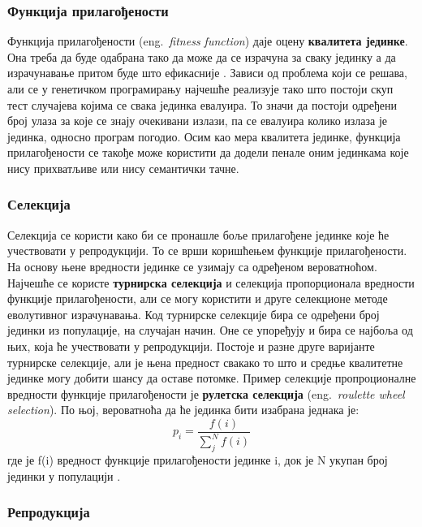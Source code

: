 \documentclass[a4paper]{article}
\begin{document}
\subsubsection{Функција прилагођености}

Функција прилагођености (eng.~{\em fitness function}) даје оцену \textbf{квалитета јединке}. Она треба да буде одабрана тако да може да се израчуна за сваку јединку а да израчунавање притом буде што ефикасније \cite{vi}. Зависи од проблема који се решава, али се у генетичком програмирању најчешће реализује тако што постоји скуп тест случајева којима се свака јединка евалуира. То значи да постоји одређени број улаза за које се знају очекивани излази, па се евалуира колико излаза је јединка, односно програм погодио.
Осим као мера квалитета јединке, функција прилагођености се такође може користити да додели пенале оним јединкама које нису прихватљиве или нису семантички тачне.

\subsubsection{Селекција}

Селекција се користи како би се пронашле боље прилагођене јединке које ће учествовати у репродукцији. То се врши коришћењем функције прилагођености. На основу њене вредности јединке се узимају са одређеном вероватноћом. Најчешће се користе \textbf{турнирска селекција} и селекција пропорционала вредности функције прилагођености, али се могу користити и друге селекционе методе еволутивног израчунавања. Код турнирске селекције бира се одређени број јединки из популације, на случајан начин. Оне се упоређују и бира се најбоља од њих, која ће учествовати у репродукцији. Постоје и разне друге варијанте турнирске селекције, али је њена предност свакако то што и средње квалитетне јединке могу добити шансу да оставе потомке. Пример селекције пропроционалне вредности функције прилагођености је \textbf{рулетска селекција} (eng.~{\em roulette wheel selection}). По њој, вероватноћа да ће јединка бити изабрана једнака је: 
\begin{equation} 
    p_i = \frac{f(i)}{\sum_{j}^{N} f(i)}
\end{equation}
где је f(i) вредност функције прилагођености јединке i, док је N укупан број јединки у популацији \cite{vi}.

\subsubsection{Репродукција}
\label{sec:reprodukcija}
\end{document}
